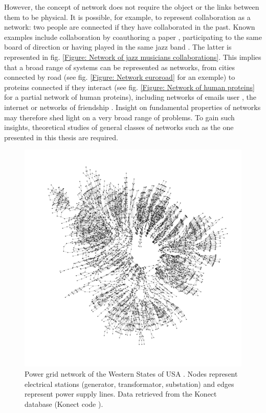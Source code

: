 \documentclass[
11pt, %
american, %
singlespacing, %
final, %
nolistspacing, %
liststotoc, %
headsepline, %
]{MastersDoctoralThesis} %
\begin{document}
However, the concept of network does not require the object or the links between them to be physical. It is possible, for example, to represent collaboration as a network: two people are connected if they have collaborated in the past. Known examples include collaboration by coauthoring a paper \cite{grossman1995portion}, participating to the same board of direction \cite{davis1997corporate} or having played in the same jazz band \cite{gleiser2003community}. The latter is represented in fig. \ref{Figure: Network of jazz musicians collaborations}. This implies that a broad range of systems can be represented as networks, from cities connected by road \cite{leskovec2008community, subelj2011robust} (see fig. \ref{Figure: Network euroroad} for an exemple) to proteins connected if they interact \cite{ewing2007large, rual2005towards, stelzl2005human} (see fig. \ref{Figure: Network of human proteins} for a partial network of human proteins), including networks of emails user \cite{guimera2003self, newman2002email}, the internet \cite{albert1999internet} or networks of friendship \cite{foster1963study}. Insight on fundamental properties of networks may therefore shed light on a very broad range of problems. To gain such insights, theoretical studies of general classes of networks such as the one presented in this thesis are required.

\begin{figure}
	\includegraphics[width=\textwidth]{network-US-power-grid.pdf}
	\caption{Power grid network of the Western States of USA \cite{watts1998collective}. Nodes represent electrical stations (generator, transformator, substation) and edges represent power supply lines. Data retrieved from the Konect database \cite{kunegis2013konect} (Konect code ).}
	\label{Figure: Network of western US powergrid}
\end{figure}
\end{document}

